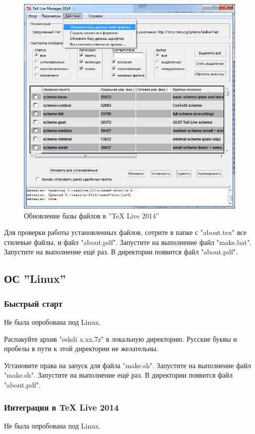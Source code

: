 \begin{figure}[H]\center
  \captionsetup{singlelinecheck=true} %
  \includegraphics*[scale=0.65]{./about/texlive2014_update_files}
  \caption{Обновление базы файлов в ''TeX Live 2014''} \label{p:texlive2014_update_files}
\end{figure}

Для проверки работы установленных файлов, сотрите в папке с "about.tex" все стилевые файлы, и файл "about.pdf".
Запустите на выполнение  файл "make.bat". Запустите на выполнение ещё раз. В директории появится файл "about.pdf".




\subsection{ОС ''Linux''}


\subsubsection{Быстрый старт}
Не была опробована под Linux.

Распакуйте архив "eskdi x.xx.7z" в локальную директорию. Русские буквы и пробелы в пути к этой  директории не желательны.

Установите права на запуск для файла "make.sh". Запустите на выполнение  файл "make.sh". Запустите на выполнение ещё раз. В директории появится файл "about.pdf".


\subsubsection{Интеграция в TeX Live 2014}
Не была опробована под Linux.














